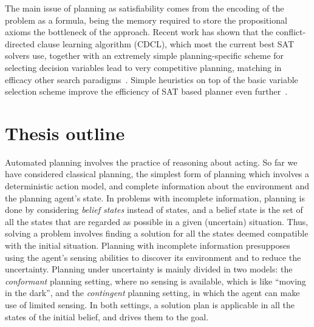 The main issue of planning as satisfiability comes from the encoding of the problem as a formula, being the memory required
to store the propositional axioms the bottleneck of the approach.
Recent work has shown that the conflict-directed clause learning algorithm (CDCL), which most the current best SAT solvers use, 
together with an extremely simple planning-specific scheme for selecting decision variables 
lead to very competitive planning, matching in efficacy other search paradigms~\citep{rintanen:heuristics}.
Simple heuristics on top of the basic variable selection scheme improve the efficiency of SAT based planner even further~\citep{rintanen:SAT-heuristics}.


\section{Thesis outline}
Automated planning involves the practice of reasoning about acting. 
So far we have considered classical planning, the simplest form of planning which involves a deterministic action model, and complete information about the environment and the planning agent's state.
In problems with incomplete information, planning is done by considering \emph{belief states} instead of states, and a belief state is the set of all the states that are regarded as possible in a given (uncertain) situation.
Thus, solving a problem involves finding a solution for all the states deemed compatible with the initial situation. Planning with incomplete information presupposes using the agent's sensing abilities to discover its environment and to reduce the uncertainty.
Planning under uncertainty is mainly divided in two models: the \emph{conformant} planning setting, where no sensing is available, which is like ``moving in the dark'', and the \emph{contingent} planning setting, in which the agent can make use of limited sensing.
In both settings, a solution plan is applicable in all the states of the initial belief, and drives them to the goal.


